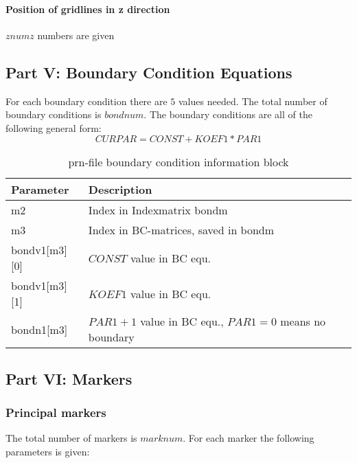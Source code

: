 \paragraph{Position of gridlines in z direction} $znumz$ numbers are given

\subsection{Part V: Boundary Condition Equations}

For each boundary condition there are $5$ values needed. The total number of boundary conditions is $bondnum$. The boundary conditions are all of the following general form:
$$CURPAR = CONST + KOEF1*PAR1$$

\begin{table}[H]
\small
\centering
\begin{tabular}{l p{9cm}}
\toprule
Parameter & Description\\
\midrule
m2 & Index in Indexmatrix bondm\\ 
m3 & Index in BC-matrices, saved in bondm \\ 
bondv1[m3][0] &  $CONST$ value in BC equ. \\ 
bondv1[m3][1] &  $KOEF1$ value in BC equ. \\ 
bondn1[m3] & $PAR1+1$ value in BC equ., $PAR1=0$ means no boundary \\ 
\bottomrule
\end{tabular}
\caption{prn-file boundary condition information block}
\label{tbl:prn_bond_info}
\end{table}

\subsection{Part VI: Markers}

\subsubsection{Principal markers}
The total number of markers is $marknum$. For each marker the following parameters is given:

